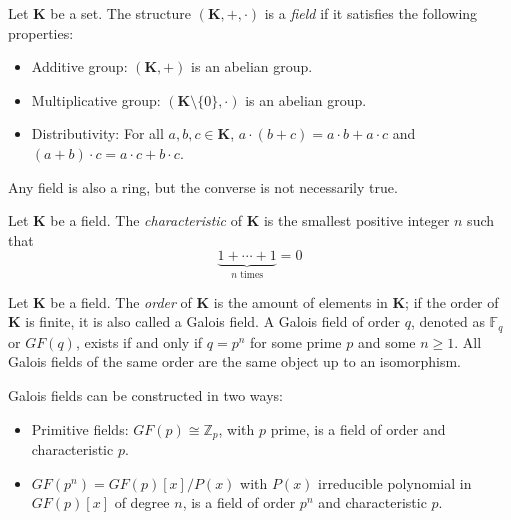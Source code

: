 \begin{definition}[Field]
    Let $\mathbf{K}$ be a set. The structure $(\mathbf{K}, +, \cdot)$ is a \emph{field} if it satisfies the following properties:
    \begin{itemize}
        \item Additive group: $(\mathbf{K}, +)$ is an abelian group.
        \item Multiplicative group: $(\mathbf{K}\setminus\{0\}, \cdot)$ is an abelian group.
        \item Distributivity: For all $a, b, c \in \mathbf{K}$, $a \cdot (b + c) = a \cdot b + a \cdot c$ and $(a + b) \cdot c = a \cdot c + b \cdot c$.
    \end{itemize}
    Any field is also a ring, but the converse is not necessarily true.
\end{definition}

\begin{definition}[Characteristic]
    Let $\mathbf{K}$ be a field. The \emph{characteristic} of $\mathbf{K}$ is the smallest positive integer $n$ such that
    \begin{equation*}
        \underbrace{1 + \cdots + 1}_\text{$n$ times} = 0
    \end{equation*}
\end{definition}

\begin{definition}[Order]
    Let $\mathbf{K}$ be a field. The \emph{order} of $\mathbf{K}$ is the amount of elements in $\mathbf{K}$; if the order of $\mathbf{K}$ is finite, it is also called a Galois field.
    A Galois field of order $q$, denoted as $\mathds{F}_q$ or $GF(q)$, exists if and only if $q=p^n$ for some prime $p$ and some $n \geqslant 1$. All Galois fields of the same order
    are the same object up to an isomorphism.
\end{definition}
Galois fields can be constructed in two ways:
\begin{itemize}
    \item Primitive fields: $GF(p) \cong \mathds{Z}_p$, with $p$ prime, is a field of order and characteristic $p$.
    \item $GF(p^n) = GF(p)[x]/P(x)$ with $P(x)$ irreducible polynomial in $GF(p)[x]$ of degree $n$,
        is a field of order $p^n$ and characteristic $p$.
\end{itemize}

